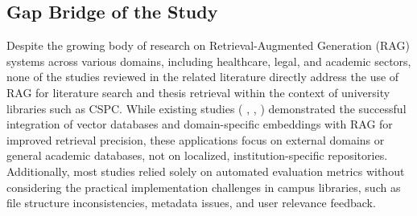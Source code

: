 \begin{refsection}


\section{Gap Bridge of the Study}
\hspace{1cm}Despite the growing body of research on Retrieval-Augmented Generation (RAG) systems across various domains, including healthcare, legal, and academic sectors, none of the studies reviewed in the related literature directly address the use of RAG for literature search and thesis retrieval within the context of university libraries such as CSPC. While existing studies (\citeauthor{arzideh2024miracle} \citeyear{arzideh2024miracle}, \citeauthor{grigoryan2024building} \citeyear{grigoryan2024building}, \citeauthor{aquino2024extracting} \citeyear{aquino2024extracting}) demonstrated the successful integration of vector databases and domain-specific embeddings with RAG for improved retrieval precision, these applications focus on external domains or general academic databases, not on localized, institution-specific repositories. Additionally, most studies relied solely on automated evaluation metrics without considering the practical implementation challenges in campus libraries, such as file structure inconsistencies, metadata issues, and user relevance feedback.


\end{refsection}
